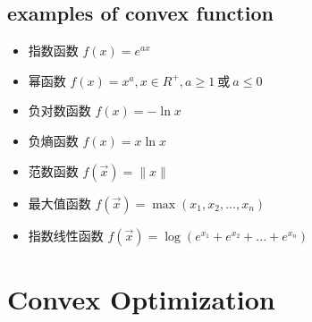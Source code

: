 \documentclass[oneside, 12pt]{ctexbook}
\begin{document}
		\section{\quad examples of convex function}
			\begin{itemize}
				\item 指数函数 $f(x) = e^{ax}$
				
				\item 幂函数 $f(x) = x^a, x \in R^+, a \geq 1 \ \text{或} \ a \leq 0$
				
				\item 负对数函数 $f(x) = -\ln x$
				
				\item 负熵函数 $f(x) = x\ln x$
				
				\item 范数函数 $f(\vec{x}) = \parallel x \parallel$
				
				\item 最大值函数 $f(\vec{x}) = \max (x_1, x_2, ..., x_n)$
				
				\item 指数线性函数 $f(\vec{x}) = \log \left( e^{x_1} + e^{x_2} + ... + e^{x_n} \right)$
			\end{itemize}
			
	\chapter{\quad Convex Optimization}
		\thispagestyle{fancy}
\end{document}
